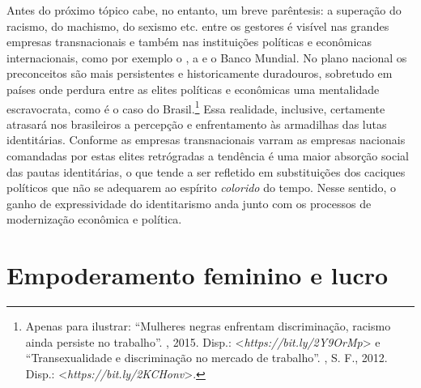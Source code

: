 Antes do próximo tópico cabe, no entanto, um breve parêntesis: a
superação do racismo, do machismo, do sexismo etc. entre os gestores é
visível nas grandes empresas transnacionais e também nas instituições
políticas e econômicas internacionais, como por exemplo o , a  e o
Banco Mundial. No plano nacional os preconceitos são mais persistentes e
historicamente duradouros, sobretudo em países onde perdura entre as
elites políticas e econômicas uma mentalidade escravocrata, como é o
caso do Brasil.\footnote{Apenas para ilustrar: ``Mulheres negras
  enfrentam discriminação, racismo ainda persiste no trabalho''.
  , 2015. Disp.:
  \textless{}\emph{https://bit.ly/2Y9OrMp}\textgreater{}
  e ``Transexualidade e discriminação no mercado de trabalho''. , S. F., 2012. Disp.:
  \textless{}\emph{https://bit.ly/2KCHonv}\textgreater{}.}
Essa realidade, inclusive, certamente atrasará nos brasileiros a
percepção e enfrentamento às armadilhas das lutas identitárias. Conforme
as empresas transnacionais varram as empresas nacionais comandadas por
estas elites retrógradas a tendência é uma maior absorção social das
pautas identitárias, o que tende a ser refletido em substituições dos
caciques políticos que não se adequarem ao espírito \emph{colorido} do
tempo. Nesse sentido, o ganho de expressividade do identitarismo anda
junto com os processos de modernização econômica e política.

\chapter{Empoderamento feminino e lucro}

